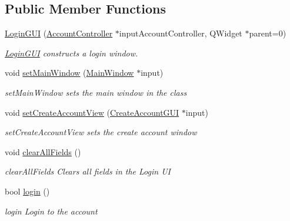 \subsection*{Public Member Functions}
\begin{DoxyCompactItemize}
\item 
\hyperlink{classLoginGUI_a463b5504797bf4189053649348314787}{Login\+G\+UI} (\hyperlink{classAccountController}{Account\+Controller} $\ast$input\+Account\+Controller, Q\+Widget $\ast$parent=0)
\begin{DoxyCompactList}\small\item\em \hyperlink{classLoginGUI}{Login\+G\+UI} constructs a login window. \end{DoxyCompactList}\item 
void \hyperlink{classLoginGUI_a25e4f8144c8d24f7f0431828e09d61f3}{set\+Main\+Window} (\hyperlink{classMainWindow}{Main\+Window} $\ast$input)
\begin{DoxyCompactList}\small\item\em set\+Main\+Window sets the main window in the class \end{DoxyCompactList}\item 
void \hyperlink{classLoginGUI_aed7e048a3e518a89a5cbc508df88831e}{set\+Create\+Account\+View} (\hyperlink{classCreateAccountGUI}{Create\+Account\+G\+UI} $\ast$input)
\begin{DoxyCompactList}\small\item\em set\+Create\+Account\+View sets the create account window \end{DoxyCompactList}\item 
void \hyperlink{classLoginGUI_ac35e63981f4d570fa9fb528393a8db1e}{clear\+All\+Fields} ()\hypertarget{classLoginGUI_ac35e63981f4d570fa9fb528393a8db1e}{}\label{classLoginGUI_ac35e63981f4d570fa9fb528393a8db1e}

\begin{DoxyCompactList}\small\item\em clear\+All\+Fields Clears all fields in the Login UI \end{DoxyCompactList}\item 
bool \hyperlink{classLoginGUI_a675a9105543ff0df4ae588c9c3060cf8}{login} ()\hypertarget{classLoginGUI_a675a9105543ff0df4ae588c9c3060cf8}{}\label{classLoginGUI_a675a9105543ff0df4ae588c9c3060cf8}

\begin{DoxyCompactList}\small\item\em login Login to the account \end{DoxyCompactList}\end{DoxyCompactItemize}
